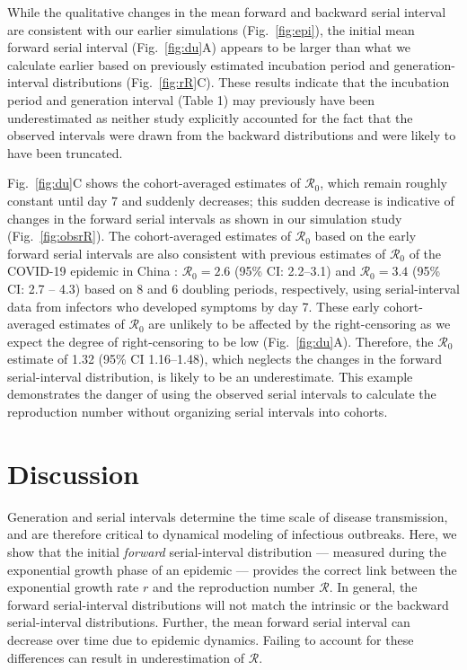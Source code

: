 \documentclass[12pt]{article}
\newcommand{\fref}[1]{Fig.~\ref{fig:#1}}
\newcommand{\Rx}[1]{\ensuremath{{\mathcal R}_{#1}}\xspace}
\newcommand{\Ro}{\Rx{0}}
\newcommand{\RR}{\ensuremath{{\mathcal R}}\xspace}
\begin{document}
While the qualitative changes in the mean forward and backward serial interval are consistent with our earlier simulations (\fref{epi}), the initial mean forward serial interval (\fref{du}A) appears to be larger than what we calculate earlier based on previously estimated incubation period and generation-interval distributions (\fref{rR}C).
These results indicate that the incubation period and generation interval (Table 1) may previously have been underestimated as neither study explicitly accounted for the fact that the observed intervals were drawn from the backward distributions and were likely to have been truncated.

\fref{du}C shows the cohort-averaged estimates of \Ro, which remain roughly constant until day 7 and suddenly decreases;
this sudden decrease is indicative of changes in the forward serial intervals as shown in our simulation study (\fref{obsrR}).
The cohort-averaged estimates of \Ro based on the early forward serial intervals are also consistent with previous estimates of \Ro of the COVID-19 epidemic in China \citep{majumder2020early, park2020reconciling}:
$\Ro = 2.6$ (95\% CI: 2.2--3.1) and $\Ro = 3.4$ (95\% CI: 2.7 -- 4.3) based on 8 and 6 doubling periods, respectively, using serial-interval data from infectors who developed symptoms by day 7.
These early cohort-averaged estimates of \Ro are unlikely to be affected by the right-censoring as we expect the degree of right-censoring to be low (\fref{du}A).
Therefore, the \Ro estimate of 1.32 (95\% CI 1.16–1.48), which neglects the changes in the forward serial-interval distribution, is likely to be an underestimate.
This example demonstrates the danger of using the observed serial intervals to calculate the reproduction number without organizing serial intervals into cohorts.

\section{Discussion}

Generation and serial intervals determine the time scale of disease transmission, and are therefore critical to dynamical modeling of infectious outbreaks.
Here, we show that the initial \emph{forward} serial-interval distribution --- measured during the exponential growth phase of an epidemic --- provides the correct link between the exponential growth rate $r$ and the reproduction number \RR.
In general, the forward serial-interval distributions will not match the intrinsic or the backward serial-interval distributions.
Further, the mean forward serial interval can decrease over time due to epidemic dynamics. 
Failing to account for these differences can result in underestimation of \RR.
\end{document}

